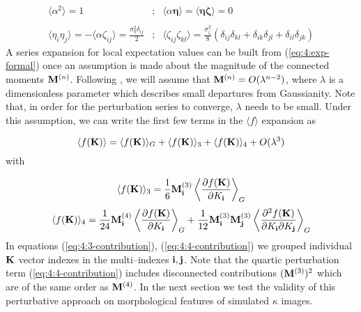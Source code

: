 \begin{equation}
\label{eq:4:cov-rotinv}
\begin{matrix}
\langle \alpha^2\rangle = 1 & ; & \langle \alpha \pmb{\eta} \rangle = \langle \pmb{\eta}\pmb{\zeta} \rangle = 0 \\ \\
\displaystyle \langle \eta_i\eta_j \rangle = -\langle \alpha \zeta_{ij} \rangle = \frac{\sigma_\eta^2 \delta_{ij}}{2} & ; & \displaystyle \langle \zeta_{ij}\zeta_{kl} \rangle = \frac{\sigma_\zeta^2}{8}(\delta_{ij}\delta_{kl}+\delta_{ik}\delta_{jl}+\delta_{il}\delta_{jk})
\end{matrix}
\end{equation}
%
A series expansion for local expectation values can be built from (\ref{eq:4:exp-formal}) once an assumption is made about the magnitude of the connected moments $\mathbf{M}^{(n)}$. Following \citep{MatsubaraLong}, we will assume that $\mathbf{M}^{(n)}=O(\lambda^{n-2})$, where $\lambda$ is a dimensionless parameter which describes small departures from Gaussianity. Note that, in order for the perturbation series to converge, $\lambda$ needs to be small. Under this assumption, we can write the first few terms in the $\langle f \rangle$ expansion as 

\begin{equation}
\label{eq:4:pert-quad}
\langle f(\mathbf{K})\rangle = \langle f(\mathbf{K})\rangle_G + \langle f(\mathbf{K})\rangle_3 + \langle f(\mathbf{K})\rangle_4 + O(\lambda^3) 
\end{equation}
%
with 

\begin{equation}
\label{eq:4:3-contribution}
\langle f(\mathbf{K})\rangle_3 = \frac{1}{6}\mathbf{M}^{(3)}_{\mathbf{i}}\left\langle\frac{\partial f(\mathbf{K})}{\partial K_{\mathbf{i}}}\right\rangle_G
\end{equation}
%
\begin{equation}
\label{eq:4:4-contribution}
\langle f(\mathbf{K})\rangle_4 = \frac{1}{24}\mathbf{M}^{(4)}_{\mathbf{i}}\left\langle\frac{\partial f(\mathbf{K})}{\partial K_{\mathbf{i}}}\right\rangle_G+ \frac{1}{12}\mathbf{M}^{(3)}_{\mathbf{i}}\mathbf{M}^{(3)}_{\mathbf{j}}\left\langle\frac{\partial^2 f(\mathbf{K})}{\partial K_{\mathbf{i}}\partial K_{\mathbf{j}}}\right\rangle_G
\end{equation}
%
In equations (\ref{eq:4:3-contribution}), (\ref{eq:4:4-contribution}) we grouped individual $\mathbf{K}$ vector indexes in the multi--indexes $\mathbf{i},\mathbf{j}$. Note that the quartic perturbation term (\ref{eq:4:4-contribution}) includes disconnected contributions $(\mathbf{M}^{(3)})^2$ which are of the same order as $\mathbf{M}^{(4)}$. In the next section we test the validity of this perturbative approach on morphological features of simulated $\kappa$ images.   

